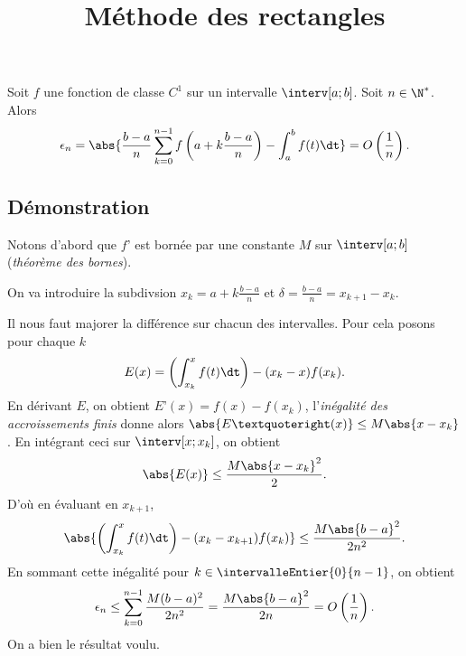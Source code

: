 \documentclass[fontsize=12pt,twoside=false,parskip=half]{scrartcl}
\title{Méthode des rectangles}
\date{}
\author{}
\begin{document}
\maketitle
   \begin{Theoreme}
      Soit $f$ une fonction de classe $C^1$ sur un intervalle $\interv[a; b]$. Soit $n \in \N^*$. Alors
      \[
        \epsilon_n = \abs{\frac{b - a}{n}\sum_{k = 0}^{n - 1} f\left(a + k \frac{b - a}{n}\right) - \int_a^b f(t) \dt} = O\left(\frac{1}{n}\right).
      \]
   \end{Theoreme}
   \subsection{Démonstration}
      Notons d’abord que $f’$ est bornée par une constante $M$ sur $\interv[a; b]$ (\emph{théorème des bornes}).
      
      On va introduire la subdivsion $x_k = a + k \frac{b - a}{n}$ et $\delta = \frac{b - a}{n} = x_{k + 1} - x_k$.

      Il nous faut majorer la différence sur chacun des intervalles. Pour cela posons pour chaque $k$
      \[
         E(x) = \left(\int_{x_k}^{x} f(t) \dt \right) - (x_k - x) f(x_k).
      \]
      En dérivant $E$, on obtient $E’(x) = f(x) - f(x_k)$, l’\emph{inégalité des accroissements finis} donne alors
      $\abs{E’(x)} \leq M\abs{x - x_k}$. En intégrant ceci sur $\interv[x; x_k]$, on obtient
      \[
         \abs{E(x)} \leq \frac{M\abs{x - x_k}^2}{2}.
      \]
      D’où en évaluant en $x_{k + 1}$,
      \[
         \abs{\left(\int_{x_k}^{x} f(t) \dt \right) - (x_k - x_{k + 1}) f(x_k)} \leq \frac{M\abs{b - a}^2}{2n^2}.
      \]
      En sommant cette inégalité pour $k \in \intervalleEntier{0}{n - 1}$, on obtient
      \[
         \epsilon_n  \leq \sum_{k = 0}^{n - 1} \frac{M(b - a)^2}{2n^2} = \frac{M\abs{b - a}^2}{2n} = O\left(\frac{1}{n}\right).
      \]
      On a bien le résultat voulu.
\end{document}
